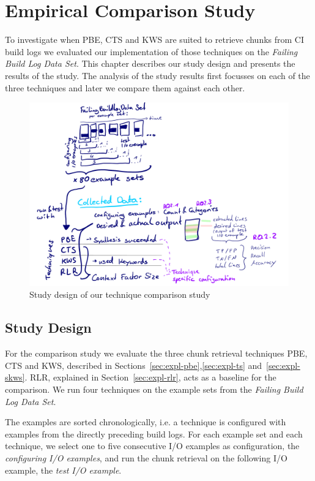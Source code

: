 \documentclass[\myrootdir/main.tex]{subfiles}
\begin{document}
\chapter{Empirical Comparison Study}
\label{sec:study}
To investigate when PBE, CTS and KWS are suited to retrieve chunks from CI build logs we evaluated our implementation of those techniques on the \emph{Failing Build Log Data Set}.
This chapter describes our study design and presents the results of the study.
The analysis of the study results first focusses on each of the three techniques and later we compare them against each other.


\begin{figure}[htbp]
	\centering
	\includegraphics[width=\textwidth, clip]{img/study-design.pdf}
	\caption{Study design of our technique comparison study}
	\label{fig:study}
\end{figure}

\section{Study Design}
For the comparison study we evaluate the three chunk retrieval techniques PBE, CTS and KWS, described in Sections~\ref{sec:expl-pbe},\ref{sec:expl-ts} and~\ref{sec:expl-skws}.
RLR, explained in Section~\ref{sec:expl-rlr}, acts as a baseline for the comparison.
We run four techniques on the example sets from the \emph{Failing Build Log Data Set}.

The examples are sorted chronologically, i.e. a technique is configured with examples from the directly preceding build logs.
For each example set and each technique, we select one to five consecutive I/O examples as configuration, the \emph{configuring I/O examples}, and run the chunk retrieval on the following I/O example, the \emph{test I/O example}.
\end{document}
